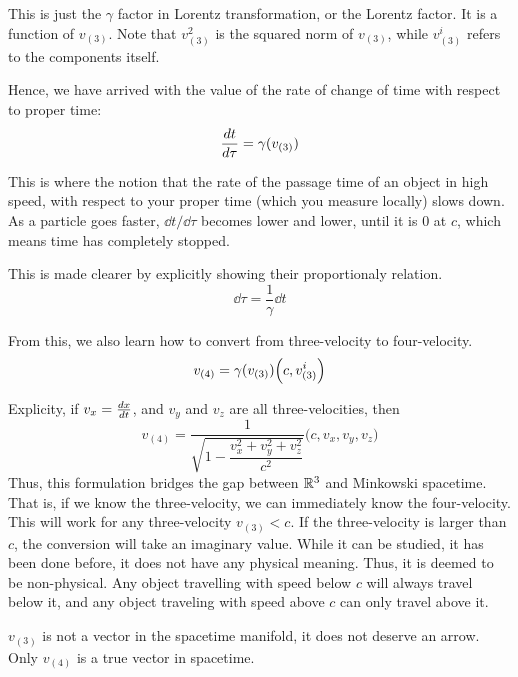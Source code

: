 		This is just the $\gamma$ factor in Lorentz transformation, or the Lorentz factor.
		It is a function of $v_{(3)}$. Note that $v^2_{(3)}$ is the squared
		norm of $v_{(3)}$, while $v^i_{(3)}$ refers to the components itself.

		Hence, we have 
		arrived with the value of the rate of change of time 
		with respect to proper time:
		\begin{equation}
			\label{eq:dtdtau-gamma}
			\dv{t}{\tau} = \gamma(v_{(3)}) 
		\end{equation}

		This is where the notion that the rate of the passage time of an object in high speed,
		with respect to your proper time (which you measure locally) slows down. As a 
		particle goes faster, $\dd{t}/\dd{\tau}$ becomes lower and lower, until it is $0$ at
		$c$, which means time has completely stopped. 

		This is made clearer by explicitly showing their proportionaly relation.
		\[
			\dd{\tau} = \frac{1}{\gamma}\dd{t} 
		\]

		From this, we also learn how to convert from three-velocity to four-velocity. 
		\begin{equation}
			\label{eq:3vel-to-4vel}
			v_{(4)} = \gamma(v_{(3)}) \pqty{ c , v^i_{(3)} }
		\end{equation}

		Explicity, if $v_x = \dv{x}{t}$, and $v_y$ and $v_z$ are 
		all three-velocities, then
		\[
			v_{(4)} = 
			\frac{1}{
				\sqrt{
					1 - 
					\dfrac{
						v_x^2 + v_y^2 + v_z^2  
					}{c^2} 
				}
			}
			\bigl(
				c, v_x, v_y, v_z
			\bigr)
		\]
		Thus, this formulation bridges the gap between $\mathbb{R}^3$ and Minkowski 
		spacetime. 
		That is, if we know the three-velocity, we can immediately know
		the four-velocity. This will work for any three-velocity $v_{(3)} < c$.
		If the three-velocity is larger than $c$, the conversion will take
		an imaginary value. While it can be studied, it has been done before,
		it does not have any physical meaning. Thus,
		it is deemed to be non-physical. Any object travelling with speed below $c$ will always travel 
		below it, and any object traveling with speed above $c$ can only travel above it.

		\begin{remark}
			$v_{(3)}$ is not a vector in the spacetime manifold, it does not
			deserve an arrow. Only $v_{(4)}$ is a true vector in spacetime. 
		\end{remark}
		
